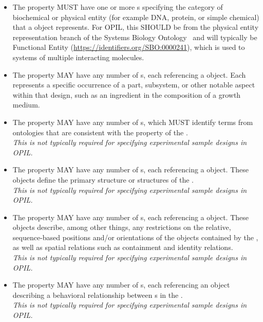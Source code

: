 \begin{itemize}
\item \label{sec:sbol:type:C}
The  property MUST have one or more s specifying the category of biochemical or physical entity (for example DNA, protein, or simple chemical) that a  object represents.
For OPIL, this SHOULD be from the physical entity representation branch of the Systems Biology Ontology~\citep{SBO}
and will typically be Functional Entity (\url{https://identifiers.org/SBO:0000241}), which is used to systems of multiple interacting molecules.

\item \label{sec:sbol:hasFeature}
The  property MAY have any number of s, each referencing a  object. Each  represents a specific occurrence of a part, subsystem, or other notable aspect within that design, such as an ingredient in the composition of a growth medium.

\item \label{sec:sbol:role:C}
The  property MAY have any number of s, which MUST identify terms from ontologies that are consistent with the  property of the . 
\\{\em This is not typically required for specifying experimental sample designs in OPIL.}

\item \label{sec:sbol:hasSequence:C}
The  property MAY have any number of s, each referencing a  object.  These objects define the primary structure or structures of the .
\\{\em This is not typically required for specifying experimental sample designs in OPIL.}

\item \label{sec:sbol:hasConstraint}
The  property MAY have any number of s, each referencing a  object.
These objects describe, among other things, any restrictions on the relative, sequence-based positions and/or orientations of the  objects contained by the , as well as spatial relations such as containment and identity relations.
\\{\em This is not typically required for specifying experimental sample designs in OPIL.}

\item \label{sec:sbol:hasInteraction}
The  property MAY have any number of s, each referencing an  object describing a behavioral relationship between s in the .
\\{\em This is not typically required for specifying experimental sample designs in OPIL.}


\end{itemize}
